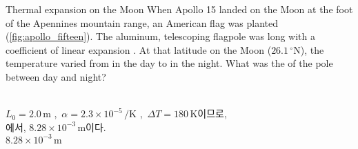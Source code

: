 \begin{practicebox}{Thermal expansion on the Moon}
\apollofifteen
When Apollo 15 landed on the Moon at the foot of
the Apennines mountain range, an American flag was
planted (\autoref{fig:apollo_fifteen}).
The aluminum, telescoping flagpole
was  long with a coefficient of linear expansion
. At that latitude on the Moon
($26.1\,^\circ\mathrm{N}$), the temperature varied from 
in the day to  in the night.
What was the  of the pole between day and night? \\\vspace{-12pt}%
%
\end{practicebox}

\begin{solbox}
\bnset
{} \\
$L_0 = 2.0\,\mathrm{m}$ ,\,
$\alpha = 2.3 \times 10^{-5}\,/\mathrm{K}$ ,\,
$\Delta T = 180\,\mathrm{K}$이므로, \\
에서,
$8.28 \times 10^{-3}\,\mathrm{m}$이다. \\
 $8.28 \times 10^{-3}\,\mathrm{m}$
\end{solbox}

